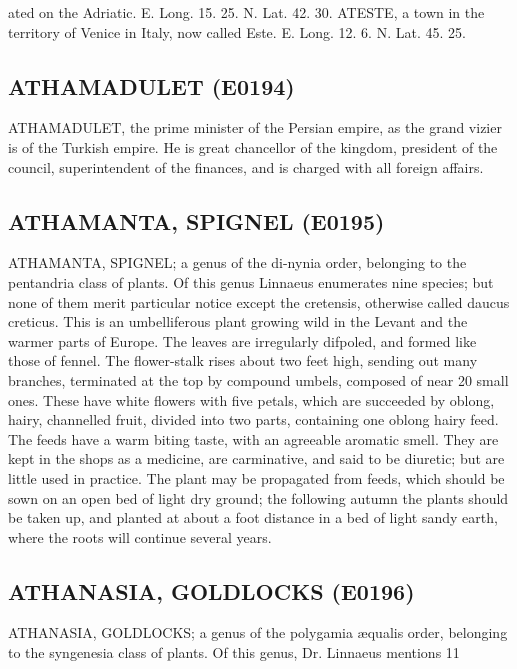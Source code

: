 \documentclass{article}
\begin{document}
ated on the Adriatic. E. Long. 15. 25. N. Lat. 42. 30.
ATESTE, a town in the territory of Venice in
Italy, now called Este. E. Long. 12. 6. N. Lat. 45. 25.

\subsection*{ATHAMADULET (E0194)}
ATHAMADULET, the prime minister of the Persian empire, as the grand vizier is of the Turkish empire. He is great chancellor of the kingdom, president of the council, superintendent of the finances, and is charged with all foreign affairs.

\subsection*{ATHAMANTA, SPIGNEL (E0195)}
ATHAMANTA, SPIGNEL; a genus of the di-nynia order, belonging to the pentandria class of plants. Of this genus Linnaeus enumerates nine species; but none of them merit particular notice except the cretensis, otherwise called daucus creticus. This is an umbelliferous plant growing wild in the Levant and the warmer parts of Europe. The leaves are irregularly difpoled, and formed like those of fennel. The flower-stalk rises about two feet high, sending out many branches, terminated at the top by compound umbels, composed of near 20 small ones. These have white flowers with five petals, which are succeeded by oblong, hairy, channelled fruit, divided into two parts, containing one oblong hairy feed. The feeds have a warm biting taste, with an agreeable aromatic smell. They are kept in the shops as a medicine, are carminative, and said to be diuretic; but are little used in practice. The plant may be propagated from feeds, which should be sown on an open bed of light dry ground; the following autumn the plants should be taken up, and planted at about a foot distance in a bed of light sandy earth, where the roots will continue several years.

\subsection*{ATHANASIA, GOLDLOCKS (E0196)}
ATHANASIA, GOLDLOCKS; a genus of the polygamia æqualis order, belonging to the syngenesia class of plants. Of this genus, Dr. Linnaeus mentions 11
\end{document}
